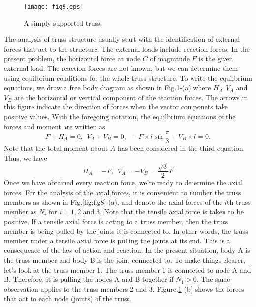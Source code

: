\documentclass[10pt,a4j]{article}
\begin{document}
\begin{figure}[h]
	\begin{center}
	\texttt{[image: fig9.eps]} 
	\end{center}
	\caption{A simply supported truss.} 
	\label{fig:fig9}
\end{figure}
The analysis of truss structure usually start with the identification of 
external forces that act to the structure. 
The external loads include reaction forces.  
In the present problem, the horizontal force at node $C$ of magnitude $F$ 
is the given external load.
The reaction forces are not known, but we can determine them using 
equilbrium conditions for the whole truss structure. To write the 
equilbrium equations, we draw a free body diagram as shown in Fig.\ref{fig:fig9}-(a)
where $H_A, V_A$ and $V_B$ are the horizontal or vertical component 
of the reaction forces. The arrows in this figure indicate the direction of 
forces when the vector componets take positive values. 
With the foregoing notation, the equilbrium equations of the forces 
and moment are written as
\begin{equation}
	F+H_A=0, \ \ V_A+V_B=0, \ \ -F\times l\sin\frac{\pi}{3}+V_B\times l=0.
	\label{eqn:}
\end{equation}
Note that the total moment about $A$ has been considered in the third equation.
Thus, we have 
\begin{equation}
	H_A=-F, \ \ V_A=-V_B=\frac{\sqrt{3}}{2}F
	\label{eqn:}
\end{equation}
Once we have obtained every reaction force, we're ready to determine the axial forces. 
For the analysis of the axial forces, it is convenient to number the truss members as 
shown in Fig.\ref{fig:fig8}-(a), and denote the axial forces of the $i$th truss member 
as $N_i$ for $i=1,2$ and 3. Note that the tensile axial force is taken to be positive. 
If a tensile axial force is acting to a truss member, then the truss member is 
being pulled by the joints it is connected to. 
In other words, the truss member under a tensile axial force is pulling 
the joints at its end. This is a consequence of the law of action and reaction.
In the present situation, body A is the truss member and body B is the joint connected to.
To make things clearer, let's look at the truss member 1. The truss member 1 is connected 
to node A and B. Therefore, it is pulling the nodes A and B together if $N_1>0$. 
The same observation applies to the truss members 2 and 3. 
Figure.\ref{fig:fig9}-(b) shows the forces that act to each node (joints) of the truss. 
\end{document}
